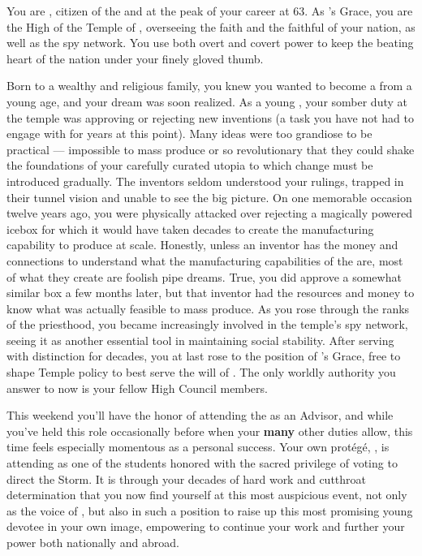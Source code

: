 \documentclass[char]{GL2020}
\begin{document}
\name{\cAntiChup{}}

You are \cAntiChup{\intro}, citizen of the \pTech{} and at the peak of your career at 63. As \cTechGod{}'s Grace, you are the High \cAntiChup{\Cleric} of the Temple of \cTechGod{}, overseeing the faith and the faithful of your nation, as well as the \pTech{} spy network. You use both overt and covert power to keep the beating heart of the nation under your finely gloved thumb.

Born to a wealthy and religious family, you knew you wanted to become a \cAntiChup{\cleric} from a young age, and your dream was soon realized. As a young \cAntiChup{\cleric}, your somber duty at the temple was approving or rejecting new inventions (a task you have not had to engage with for years at this point). Many ideas were too grandiose to be practical — impossible to mass produce or so revolutionary that they could shake the foundations of your carefully curated utopia to which change must be introduced gradually. The inventors seldom understood your rulings, trapped in their tunnel vision and unable to see the big picture. On one memorable occasion twelve years ago, you were physically attacked over rejecting a magically powered icebox for which it would have taken decades to create the manufacturing capability to produce at scale. Honestly, unless an inventor has the money and connections to understand what the manufacturing capabilities of the \pTech{} are, most of what they create are foolish pipe dreams. True, you did approve a somewhat similar box a few months later, but that inventor had the resources and money to know what was actually feasible to mass produce. As you rose through the ranks of the priesthood, you became increasingly involved in the temple's spy network, seeing it as another essential tool in maintaining social stability. After serving with distinction for decades, you at last rose to the position of \cTechGod{}'s Grace, free to shape Temple policy to best serve the will of \cTechGod{}. The only worldly authority you answer to now is your fellow High Council members.

This weekend you'll have the honor of attending the \pSchool{} as an Advisor, and while you've held this role occasionally before when your \textbf{many} other duties allow, this time feels especially momentous as a personal success. Your own protégé, \cScholarship{\full}, is attending as one of the students honored with the sacred privilege of voting to direct the Storm. It is through your decades of hard work and cutthroat determination that you now find yourself at this most auspicious event, not only as the voice of \cTechGod{} \cTechGod{\themself}, but also in such a position to raise up this most promising young devotee in your own image, empowering \cScholarship{\them} to continue your work and further your power both nationally and abroad.  
\end{document}
